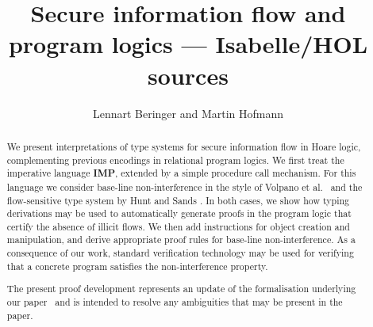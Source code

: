 \documentclass[11pt,a4paper]{article}
\begin{document}
\title{Secure information flow and program logics --- Isabelle/HOL sources}
\author{Lennart Beringer and Martin Hofmann}

\maketitle

\begin{abstract}
  We present interpretations of type systems for secure
  information flow in Hoare logic, complementing previous encodings in
  relational program logics. We first treat the imperative language
  {\bf IMP}, extended by a simple procedure call mechanism. For this
  language we consider base-line non-interference in the style of
  Volpano et al.~\cite{VolpanoSmithIrvine:JCS1996} and the
  flow-sensitive type system by Hunt and Sands
  \cite{HuntSands:POPL2006}. In both cases, we show how typing
  derivations may be used to automatically generate proofs in the
  program logic that certify the absence of illicit flows. We then add
  instructions for object creation and manipulation, and derive
  appropriate proof rules for base-line non-interference. As a
  consequence of our work, standard verification technology may be
  used for verifying that a concrete program satisfies the
  non-interference property.

  The present proof development represents an update of the
  formalisation underlying our paper~\cite{BeringerHofmann:CSF2007}
  and is intended to resolve any ambiguities that may be present in
  the paper.
\end{abstract}

\tableofcontents





\end{document}
